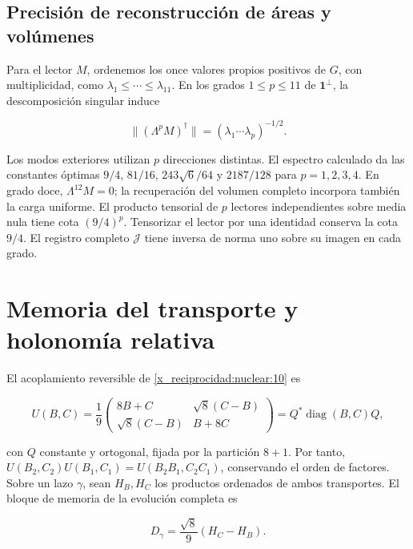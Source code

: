 \subsection{Precisión de reconstrucción de áreas y volúmenes}

Para el lector \(M\), ordenemos los once valores propios
positivos de \(G\), con multiplicidad, como
\(\lambda_1\le\cdots\le\lambda_{11}\).
En los grados \(1\le p\le11\) de \(\mathbf1^\perp\),
la descomposición singular induce



\begin{equation}
\|(\Lambda^pM)^\dagger\|
=(\lambda_1\cdots\lambda_p)^{-1/2}.
\label{x_reciprocidad:nuc11:eq:24}
\end{equation}



Los modos exteriores utilizan \(p\) direcciones distintas.
El espectro calculado da las constantes óptimas
\(9/4\), \(81/16\), \(243\sqrt6/64\) y \(2187/128\)
para \(p=1,2,3,4\).
En grado doce, \(\Lambda^{12}M=0\); la recuperación del volumen
completo incorpora también la carga uniforme.
El producto tensorial de \(p\) lectores independientes sobre
media nula tiene cota \((9/4)^p\).
Tensorizar el lector por una identidad conserva la cota \(9/4\).
El registro completo \(\mathcal J\) tiene inversa de norma uno
sobre su imagen en cada grado.

\section{Memoria del transporte y holonomía relativa}

El acoplamiento reversible de \cref{x_reciprocidad:nuclear:10} es



\[
U(B,C)=\frac19
\begin{pmatrix}8B+C&\sqrt8(C-B)\\
\sqrt8(C-B)&B+8C\end{pmatrix}
=Q^*\operatorname{diag}(B,C)Q,
\]



con \(Q\) constante y ortogonal, fijada por la partición \(8+1\).
Por tanto,
\(U(B_2,C_2)U(B_1,C_1)=U(B_2B_1,C_2C_1)\),
conservando el orden de factores.
Sobre un lazo \(\gamma\), sean \(H_B,H_C\) los productos
ordenados de ambos transportes.
El bloque de memoria de la evolución completa es



\[
D_\gamma=\frac{\sqrt8}{9}(H_C-H_B).
\]



